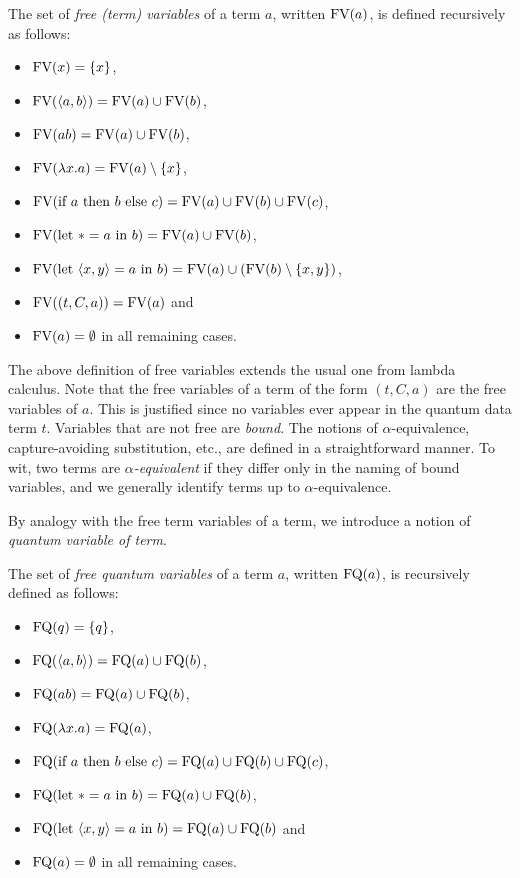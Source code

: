 \documentclass[twoside]{article}
\begin{document}
\begin{definition}
The set of \emph{free (term) variables} of a term $a$, written $\FV(a)$, 
is defined recursively as follows:
\begin{itemize}
  \item $\FV(x)=\s{x}$,
  \item $\FV(\p{a,b})=\FV(a)\cup \FV(b)$,
  \item $\FV(ab)=\FV(a)\cup \FV(b)$,
  \item $\FV(\lambda x.a)=\FV(a)\setminus\s{x}$,
  \item $\FV(\ifthenelse{a}{b}{c}) = \FV(a) \cup \FV(b) \cup \FV(c)$,
  \item $\FV(\letin{*}{a}{b}) = \FV(a)\cup \FV(b)$, 
  \item $\FV(\letin{\p{x,y}}{a}{b}) = \FV(a)\cup (\FV(b)\setminus \s{x,y})$, 
  \item $\FV((t,C,a))= \FV(a)$ and
  \item $\FV(a)=\emptyset$ in all remaining cases.
\end{itemize}
\end{definition}

The above definition of free variables extends the usual one from
lambda calculus. Note that the free variables of a term of the form
$(t,C,a)$ are the free variables of $a$. This is justified since no
variables ever appear in the quantum data term $t$. Variables that are
not free are {\em bound}. The notions of $\alpha$-equivalence,
capture-avoiding substitution, etc., are defined in a straightforward
manner. To wit, two terms are {\em $\alpha$-equivalent} if they differ
only in the naming of bound variables, and we generally identify terms
up to $\alpha$-equivalence.

By analogy with the free term variables of a term, we introduce a
notion of \emph{quantum variable of term}.

\begin{definition}
  The set of \emph{free quantum variables} of a term $a$, written
  $\FQ(a)$, is recursively defined as follows:
\begin{itemize}
  \item $\FQ(q)=\s{q}$,
  \item $\FQ(\p{a,b})=\FQ(a)\cup \FQ(b)$,
  \item $\FQ(ab)=\FQ(a)\cup \FQ(b)$,
  \item $\FQ(\lambda x.a)=\FQ(a)$,
  \item $\FQ(\ifthenelse{a}{b}{c}) = \FQ(a) \cup \FQ(b) \cup \FQ(c)$,
  \item $\FQ(\letin{*}{a}{b})= \FQ(a)\cup \FQ(b)$, 
  \item $\FQ(\letin{\p{x,y}}{a}{b})= \FQ(a)\cup \FQ(b)$ and  
  \item $\FQ(a)=\emptyset$ in all remaining cases.
\end{itemize}
\end{definition}
\end{document}
